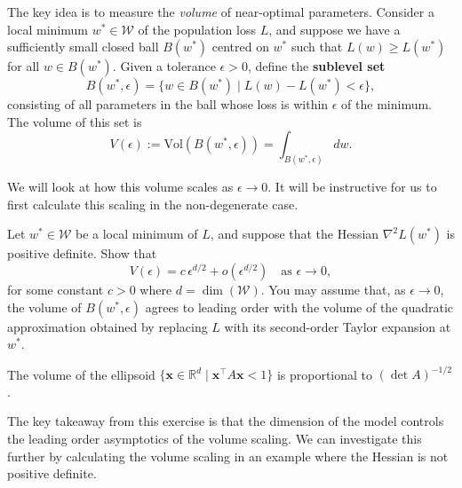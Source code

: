 \documentclass[11pt]{article}
\newcommand{\R}{\mathbb{R}}
\newcommand{\W}{\mathcal{W}}
\begin{document}
The key idea is to measure the \emph{volume} of near-optimal parameters. Consider a local minimum $w^* \in \W$ of the population loss $L$, and suppose we have a sufficiently small closed ball $B(w^*)$ centred on $w^*$ such that $L(w) \geq L(w^*)$ for all $w \in B(w^*)$. Given a tolerance $\epsilon > 0$, define the \textbf{sublevel set}
\begin{equation}\label{eq:sublevel-set}
    B(w^*, \epsilon) = \{ w \in B(w^*) \mid L(w) - L(w^*) < \epsilon \},
\end{equation}
consisting of all parameters in the ball whose loss is within $\epsilon$ of the minimum. The volume of this set is
\begin{equation}
    V(\epsilon) := \mathrm{Vol}(B(w^*, \epsilon)) = \int_{B(w^*, \epsilon)} dw.
\end{equation}

We will look at how this volume scales as $\epsilon \to 0$. It will be instructive for us to first calculate this scaling in the non-degenerate case.

\begin{exercise}
\label{ex:llc-regular-case}
    Let $w^* \in \W$ be a local minimum of $L$, and suppose that the Hessian $\nabla^2 L(w^*)$ is positive definite. Show that
    \begin{equation} \label{eq:regular-volume-scaling}
        V(\epsilon) = c \, \epsilon^{d/2} + o(\epsilon^{d/2}) \quad \text{as } \epsilon \to 0,
    \end{equation}
    for some constant $c>0$ where $d = \dim(\W)$. You may assume that, as $\epsilon \to 0$, the volume of $B(w^*,\epsilon)$ agrees to leading order with the volume of the quadratic approximation obtained by replacing $L$ with its second-order Taylor expansion at $w^*$. 

    \begin{hint}
The volume of the ellipsoid $\{\boldsymbol{x} \in \R^d \mid \boldsymbol{x}^\top A \boldsymbol{x} < 1\}$ is proportional to $(\det A)^{-1/2}$.
    \end{hint}
\end{exercise}

The key takeaway from this exercise is that the dimension of the model controls the leading order asymptotics of the volume scaling. We can investigate this further by calculating the volume scaling in an example where the Hessian is not positive definite.
\end{document}
